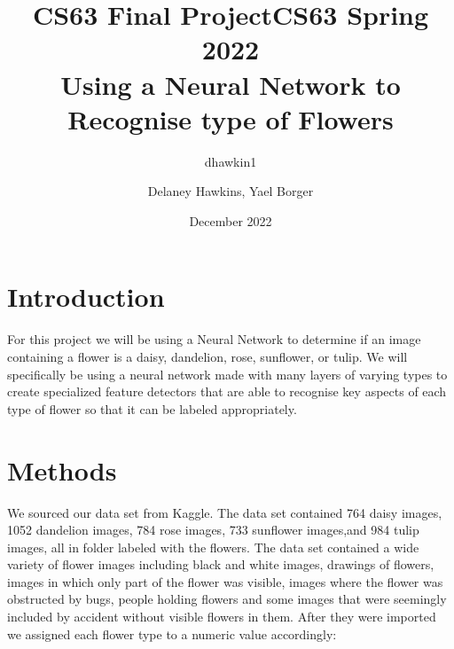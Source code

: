 \documentclass{article}
\title{CS63 Final Project}
\author{dhawkin1}
\date{December 2022}
\title{CS63 Spring 2022\\Using a Neural Network to Recognise type of Flowers}
\author{Delaney Hawkins, Yael Borger}
\date{}
\begin{document}
\maketitle

\section{Introduction}



For this project we will be using a Neural Network to determine if an image containing a flower is a daisy, dandelion, rose, sunflower, or tulip. We will specifically be using a neural network made with many layers of varying types to create specialized feature detectors that are able to recognise key aspects of each type of flower so that it can be labeled appropriately. 


\section{Methods}

We sourced our data set from Kaggle. The data set contained 764 daisy images, 1052 dandelion images, 784 rose images, 733 sunflower images,and 984 tulip images, all in folder labeled with the flowers. 
The data set contained a wide variety of flower images including black and white images, drawings of flowers, images in which only part of the flower was visible, images where the flower was obstructed by bugs, people holding flowers and some images that were seemingly included by accident without visible flowers in them. After they were imported we assigned each flower type to a numeric value accordingly: \\
\end{document}
